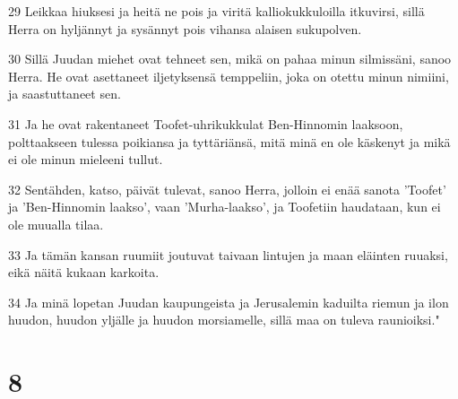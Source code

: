 \par 29 Leikkaa hiuksesi ja heitä ne pois ja viritä kalliokukkuloilla itkuvirsi, sillä Herra on hyljännyt ja sysännyt pois vihansa alaisen sukupolven.
\par 30 Sillä Juudan miehet ovat tehneet sen, mikä on pahaa minun silmissäni, sanoo Herra. He ovat asettaneet iljetyksensä temppeliin, joka on otettu minun nimiini, ja saastuttaneet sen.
\par 31 Ja he ovat rakentaneet Toofet-uhrikukkulat Ben-Hinnomin laaksoon, polttaakseen tulessa poikiansa ja tyttäriänsä, mitä minä en ole käskenyt ja mikä ei ole minun mieleeni tullut.
\par 32 Sentähden, katso, päivät tulevat, sanoo Herra, jolloin ei enää sanota 'Toofet' ja 'Ben-Hinnomin laakso', vaan 'Murha-laakso', ja Toofetiin haudataan, kun ei ole muualla tilaa.
\par 33 Ja tämän kansan ruumiit joutuvat taivaan lintujen ja maan eläinten ruuaksi, eikä näitä kukaan karkoita.
\par 34 Ja minä lopetan Juudan kaupungeista ja Jerusalemin kaduilta riemun ja ilon huudon, huudon yljälle ja huudon morsiamelle, sillä maa on tuleva raunioiksi."

\chapter{8}

